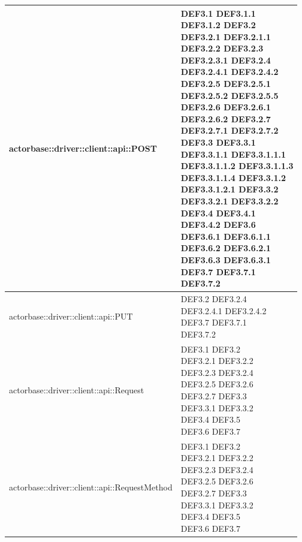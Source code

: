 \documentclass{scalatekids-article}
\begin{document}
\begin{longtable}[H]{|p{12cm}|p{5.5cm}|}
\hline
actorbase::driver::client::api::POST & \multiLineCell[t]{DEF3.1 DEF3.1.1\\DEF3.1.2 DEF3.2\\DEF3.2.1 DEF3.2.1.1\\DEF3.2.2 DEF3.2.3\\DEF3.2.3.1 DEF3.2.4\\DEF3.2.4.1 DEF3.2.4.2\\DEF3.2.5 DEF3.2.5.1\\DEF3.2.5.2 DEF3.2.5.5\\DEF3.2.6 DEF3.2.6.1\\DEF3.2.6.2 DEF3.2.7\\DEF3.2.7.1 DEF3.2.7.2\\DEF3.3 DEF3.3.1\\DEF3.3.1.1 DEF3.3.1.1.1\\DEF3.3.1.1.2 DEF3.3.1.1.3\\DEF3.3.1.1.4 DEF3.3.1.2\\DEF3.3.1.2.1 DEF3.3.2\\DEF3.3.2.1 DEF3.3.2.2\\DEF3.4 DEF3.4.1\\DEF3.4.2 DEF3.6\\DEF3.6.1 DEF3.6.1.1\\DEF3.6.2 DEF3.6.2.1\\DEF3.6.3 DEF3.6.3.1\\DEF3.7 DEF3.7.1\\DEF3.7.2}\\
\hline
actorbase::driver::client::api::PUT & \multiLineCell[t]{DEF3.2 DEF3.2.4\\DEF3.2.4.1 DEF3.2.4.2\\DEF3.7 DEF3.7.1\\DEF3.7.2}\\
\hline
actorbase::driver::client::api::Request & \multiLineCell[t]{DEF3.1 DEF3.2\\DEF3.2.1 DEF3.2.2\\DEF3.2.3 DEF3.2.4\\DEF3.2.5 DEF3.2.6\\DEF3.2.7 DEF3.3\\DEF3.3.1 DEF3.3.2\\DEF3.4 DEF3.5\\DEF3.6 DEF3.7\\}\\
\hline
actorbase::driver::client::api::RequestMethod & \multiLineCell[t]{DEF3.1 DEF3.2\\DEF3.2.1 DEF3.2.2\\DEF3.2.3 DEF3.2.4\\DEF3.2.5 DEF3.2.6\\DEF3.2.7 DEF3.3\\DEF3.3.1 DEF3.3.2\\DEF3.4 DEF3.5\\DEF3.6 DEF3.7\\}\\

\end{longtable}
\end{document}
